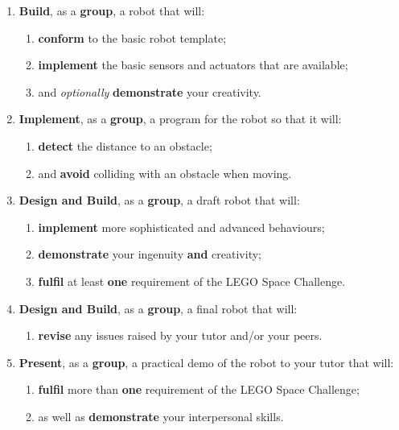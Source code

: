 \documentclass{fal_assignment}
\begin{document}
\begin{enumerate}[label=(\Alph*)]
    \item \textbf{Build}, as a \textbf{group}, a robot that will:
    	\begin{enumerate}[label=\roman*.]
    		\item \textbf{conform} to the basic robot template;
    		\item \textbf{implement} the basic sensors and actuators that are available;
    		\item and \textit{optionally} \textbf{demonstrate} your creativity.
	\end{enumerate}
    \item \textbf{Implement}, as a \textbf{group}, a program for the robot so that it will:
    	\begin{enumerate}[label=\roman*.]
    		\item \textbf{detect} the distance to an obstacle;
    		\item and \textbf{avoid} colliding with an obstacle when moving.
	\end{enumerate}
    \item \textbf{Design and Build}, as a \textbf{group}, a draft robot that will:
    	\begin{enumerate}[label=\roman*.]
    		\item \textbf{implement} more sophisticated and advanced behaviours;
    		\item \textbf{demonstrate} your ingenuity \textbf{and} creativity;
    		\item \textbf{fulfil} at least \textbf{one} requirement of the LEGO Space Challenge.
	\end{enumerate}
    \item \textbf{Design and Build}, as a \textbf{group}, a final robot that will:
    	\begin{enumerate}[label=\roman*.]
    		\item \textbf{revise} any issues raised by your tutor and/or your peers.
	\end{enumerate}
    \item \textbf{Present}, as a \textbf{group}, a practical demo of the robot to your tutor that will:
    	\begin{enumerate}[label=\roman*.]
    		\item \textbf{fulfil} more than \textbf{one} requirement of the LEGO Space Challenge;
    		\item as well as \textbf{demonstrate} your interpersonal skills.
	\end{enumerate}
\end{enumerate}
\end{document}
